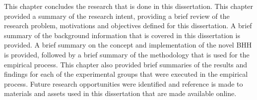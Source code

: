 This chapter concludes the research that is done in this dissertation. This chapter provided a summary of the research intent, providing a brief review of the research problem, motivations and objectives defined for this dissertation. A brief summary of the background information that is covered in this dissertation is provided. A brief summary on the concept and implementation of the novel \acs{BHH} is provided, followed by a brief summary of the methodology that is used for the empirical process. This chapter also provided brief summaries of the results and findings for each of the experimental groups that were executed in the empirical process. Future research opportunities were identified and reference is made to materials and assets used in this dissertation that are made available online.

